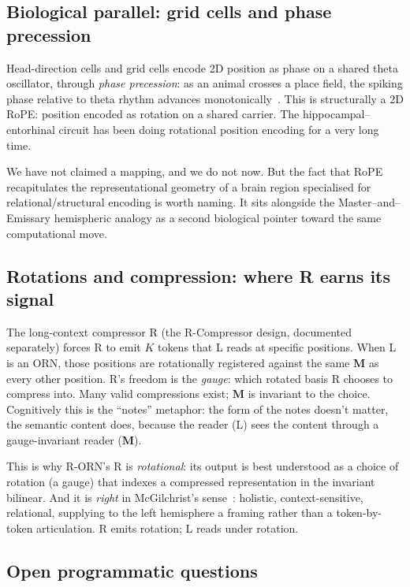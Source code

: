 \documentclass[10pt, twocolumn, a4paper]{article}
\newcommand{\M}{\mathbf{M}}
\begin{document}
\subsection{Biological parallel: grid cells and phase precession}

Head-direction cells and grid cells encode 2D position as phase on a shared theta oscillator, through \emph{phase precession}: as an animal crosses a place field, the spiking phase relative to theta rhythm advances monotonically~\cite{phase-precession-2012}. This is structurally a 2D RoPE: position encoded as rotation on a shared carrier. The hippocampal--entorhinal circuit has been doing rotational position encoding for a very long time.

We have not claimed a mapping, and we do not now. But the fact that RoPE recapitulates the representational geometry of a brain region specialised for relational/structural encoding is worth naming. It sits alongside the Master--and--Emissary hemispheric analogy as a second biological pointer toward the same computational move.

\subsection{Rotations and compression: where R earns its signal}

The long-context compressor R (the R-Compressor design, documented separately) forces R to emit $K$ tokens that L reads at specific positions. When L is an ORN, those positions are rotationally registered against the same $\M$ as every other position. R's freedom is the \emph{gauge}: which rotated basis R chooses to compress into. Many valid compressions exist; $\M$ is invariant to the choice. Cognitively this is the ``notes'' metaphor: the form of the notes doesn't matter, the semantic content does, because the reader (L) sees the content through a gauge-invariant reader ($\M$).

This is why R-ORN's R is \emph{rotational}: its output is best understood as a choice of rotation (a gauge) that indexes a compressed representation in the invariant bilinear. And it is \emph{right} in McGilchrist's sense~\cite{mcgilchrist2021matter}: holistic, context-sensitive, relational, supplying to the left hemisphere a framing rather than a token-by-token articulation. R emits rotation; L reads under rotation.

\subsection{Open programmatic questions}
\end{document}

